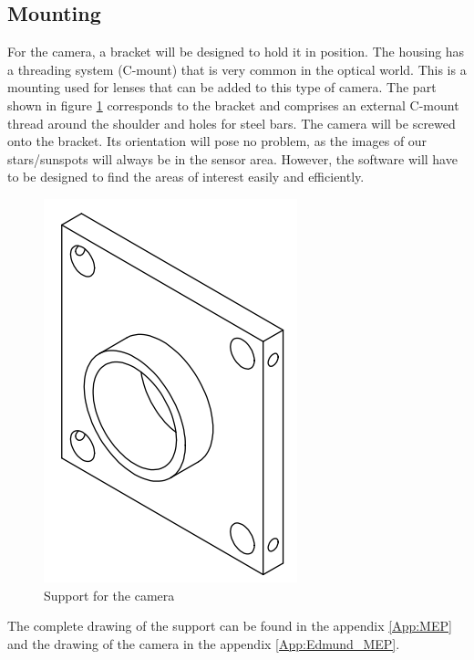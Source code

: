 \subsection{Mounting}
For the camera, a bracket will be designed to hold it in position. The housing has a threading system 
(C-mount) that is very common in the optical world. This is a mounting used for lenses that can be added 
to this type of camera. The part shown in figure \ref{fig:Camera_Support} corresponds to the bracket and comprises 
an external C-mount thread around the shoulder and holes for steel bars.
\break
The camera will be screwed onto the bracket. Its orientation will pose no problem, as the images of our 
stars/sunspots will always be in the sensor area. However, the software will have to be designed to find 
the areas of interest easily and efficiently.
\begin{figure}[H]
    \centering
    \includegraphics[scale=0.75]{assets/figures/Mechanical Design/Support_Camera.png}
    \caption{Support for the camera}
    \label{fig:Camera_Support}
\end{figure}
\bigbreak
The complete drawing of the support can be found in the appendix \ref{App:MEP} and the drawing of the camera 
in the appendix \ref{App:Edmund_MEP}.